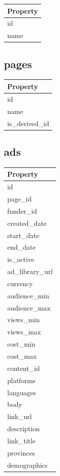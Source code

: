 \documentclass[
  letterpaper,
  DIV=11,
  numbers=noendperiod]{scrreprt}
\begin{document}
\begin{longtable}[]{@{}l@{}}
\toprule\noalign{}
Property \\
\midrule\noalign{}
\endhead
\bottomrule\noalign{}
\endlastfoot
id \\
name \\
\end{longtable}

\subsection{pages}

\begin{longtable}[]{@{}l@{}}
\toprule\noalign{}
Property \\
\midrule\noalign{}
\endhead
\bottomrule\noalign{}
\endlastfoot
id \\
name \\
is\_derived\_id \\
\end{longtable}

\subsection{ads}

\begin{longtable}[]{@{}l@{}}
\toprule\noalign{}
Property \\
\midrule\noalign{}
\endhead
\bottomrule\noalign{}
\endlastfoot
id \\
page\_id \\
funder\_id \\
created\_date \\
start\_date \\
end\_date \\
is\_active \\
ad\_library\_url \\
currency \\
audience\_min \\
audience\_max \\
views\_min \\
views\_max \\
cost\_min \\
cost\_max \\
content\_id \\
platforms \\
languages \\
body \\
link\_url \\
description \\
link\_title \\
provinces \\
demographics \\
\end{longtable}
\end{document}
